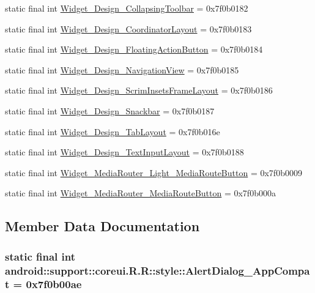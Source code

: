 \begin{CompactItemize}
\item 
static final int \hyperlink{classandroid_1_1support_1_1coreui_1_1_r_1_1style_1fd163e7a612aee1f1dd7b18362555c7}{Widget\_\-Design\_\-CollapsingToolbar} = 0x7f0b0182
\item 
static final int \hyperlink{classandroid_1_1support_1_1coreui_1_1_r_1_1style_9cc2f95e6bbd607342395e27177e8991}{Widget\_\-Design\_\-CoordinatorLayout} = 0x7f0b0183
\item 
static final int \hyperlink{classandroid_1_1support_1_1coreui_1_1_r_1_1style_05fa2b6d3b13f2cc2cf7be6da99f8b9e}{Widget\_\-Design\_\-FloatingActionButton} = 0x7f0b0184
\item 
static final int \hyperlink{classandroid_1_1support_1_1coreui_1_1_r_1_1style_6ba1f4e104cc052595001644409232fb}{Widget\_\-Design\_\-NavigationView} = 0x7f0b0185
\item 
static final int \hyperlink{classandroid_1_1support_1_1coreui_1_1_r_1_1style_694689ecbaf4ebbbdb2e2ab2fedc02d0}{Widget\_\-Design\_\-ScrimInsetsFrameLayout} = 0x7f0b0186
\item 
static final int \hyperlink{classandroid_1_1support_1_1coreui_1_1_r_1_1style_226c1127eb6186af75718f4f3804931b}{Widget\_\-Design\_\-Snackbar} = 0x7f0b0187
\item 
static final int \hyperlink{classandroid_1_1support_1_1coreui_1_1_r_1_1style_225c590d72b055755260fa35baecbfb4}{Widget\_\-Design\_\-TabLayout} = 0x7f0b016e
\item 
static final int \hyperlink{classandroid_1_1support_1_1coreui_1_1_r_1_1style_45462f366f953466141b3e118fe4264f}{Widget\_\-Design\_\-TextInputLayout} = 0x7f0b0188
\item 
static final int \hyperlink{classandroid_1_1support_1_1coreui_1_1_r_1_1style_682025ac07c8b2e672eaa2a56d27b0cf}{Widget\_\-MediaRouter\_\-Light\_\-MediaRouteButton} = 0x7f0b0009
\item 
static final int \hyperlink{classandroid_1_1support_1_1coreui_1_1_r_1_1style_ea11140badf9bc1b51086df66fcf04c8}{Widget\_\-MediaRouter\_\-MediaRouteButton} = 0x7f0b000a
\end{CompactItemize}


\subsection{Member Data Documentation}
\hypertarget{classandroid_1_1support_1_1coreui_1_1_r_1_1style_154aee67407fc74f9d71384a80ef0250}{
\subsubsection[{AlertDialog\_\-AppCompat}]{\setlength{\rightskip}{0pt plus 5cm}static final int android::support::coreui.R.R::style::AlertDialog\_\-AppCompat = 0x7f0b00ae}}
\label{classandroid_1_1support_1_1coreui_1_1_r_1_1style_154aee67407fc74f9d71384a80ef0250}


